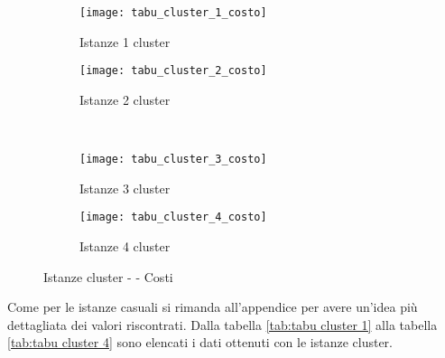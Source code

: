 \begin{figure}[H]
	\centering
	\begin{subfigure}[b]{.45\textwidth}
		\texttt{[image: tabu\_cluster\_1\_costo]}
		\caption{Istanze 1 cluster}
		\label{fig:tabu cluster 1 costo}
	\end{subfigure}
	\quad
	\begin{subfigure}[b]{.45\textwidth}
		\texttt{[image: tabu\_cluster\_2\_costo]}
		\caption{Istanze 2 cluster}
		\label{fig:tabu cluster 2 costo}
	\end{subfigure}
	\\
	\begin{subfigure}[b]{.45\textwidth}
		\texttt{[image: tabu\_cluster\_3\_costo]}
		\caption{Istanze 3 cluster}
		\label{fig:tabu cluster 3 costo}
	\end{subfigure}
	\quad
	\begin{subfigure}[b]{.45\textwidth}
		\texttt{[image: tabu\_cluster\_4\_costo]}
		\caption{Istanze 4 cluster}
		\label{fig:tabu cluster 4 costo}
	\end{subfigure}
	\caption{Istanze cluster - \tabu{} - Costi}
	\label{fig: tabu cluster costo}
\end{figure}

Come per le istanze casuali si rimanda all'appendice per avere un'idea più dettagliata dei valori riscontrati.
Dalla tabella \ref{tab:tabu cluster 1} alla tabella \ref{tab:tabu cluster 4} sono elencati i dati ottenuti con le istanze cluster.

